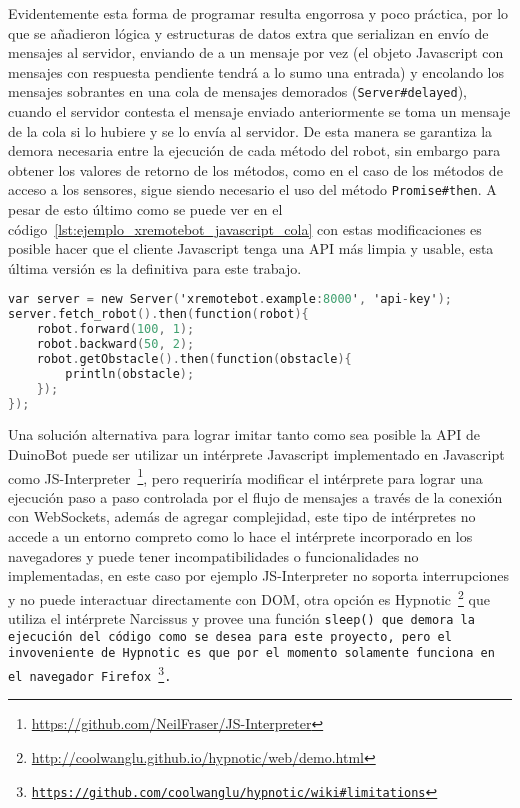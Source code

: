 Evidentemente esta forma de programar resulta engorrosa y poco práctica,
por lo que se añadieron
lógica y estructuras de datos extra que serializan en envío de mensajes al
servidor, enviando de a un mensaje por vez (el objeto Javascript con
mensajes con respuesta pendiente tendrá a lo sumo una entrada)
y encolando los mensajes sobrantes
en una cola de mensajes demorados (\texttt{Server\#delayed}), cuando
el servidor contesta el mensaje enviado anteriormente se toma un mensaje
de la cola si lo hubiere y se lo envía al servidor. De esta manera
se garantiza la demora necesaria entre la ejecución de cada método
del robot, sin embargo para obtener los valores de retorno de los métodos,
como en el caso de los métodos de acceso a los sensores, sigue siendo
necesario el uso del método \texttt{Promise\#then}. A pesar de esto último
como se puede ver en el código~\ref{lst:ejemplo_xremotebot_javascript_cola}
con estas modificaciones es posible hacer que el cliente Javascript
tenga una API más limpia y usable, esta última versión es la definitiva
para este trabajo.

\begin{lstlisting}[language=C,
caption={Ejemplo de XRemoteBot en Javascript con empleo de una cola para
serializar mensajes},
label=lst:ejemplo_xremotebot_javascript_cola]
var server = new Server('xremotebot.example:8000', 'api-key');
server.fetch_robot().then(function(robot){
    robot.forward(100, 1);
    robot.backward(50, 2);
    robot.getObstacle().then(function(obstacle){
        println(obstacle);
    });
});
\end{lstlisting}


Una solución alternativa para lograr imitar tanto como sea posible la
API de DuinoBot puede ser utilizar un intérprete Javascript implementado en
Javascript como
JS-Interpreter~\footnote{\url{https://github.com/NeilFraser/JS-Interpreter}},
pero requeriría modificar el intérprete para lograr una ejecución paso a paso
controlada por el flujo de mensajes a través de la conexión con WebSockets,
además de agregar complejidad, este tipo de intérpretes no accede a un entorno
compreto como lo hace el intérprete incorporado en los navegadores y puede
tener incompatibilidades o funcionalidades no implementadas, en este caso
por ejemplo JS-Interpreter no soporta interrupciones y no puede interactuar
directamente con DOM, otra opción es
Hypnotic~\footnote{\url{http://coolwanglu.github.io/hypnotic/web/demo.html}}
que utiliza el intérprete Narcissus y provee una función \tt{sleep()} que
demora la ejecución del código como se desea para este proyecto, pero el
invoveniente de Hypnotic es que por el momento solamente funciona en el
navegador
Firefox~\footnote{\url{https://github.com/coolwanglu/hypnotic/wiki\#limitations}}.


